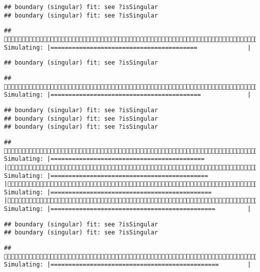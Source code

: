 \documentclass[]{article}
\begin{document}
\begin{verbatim}
## boundary (singular) fit: see ?isSingular
## boundary (singular) fit: see ?isSingular
\end{verbatim}

\begin{verbatim}
## (1/4) Simulating: |=========================================              |
\end{verbatim}

\begin{verbatim}
## boundary (singular) fit: see ?isSingular
\end{verbatim}

\begin{verbatim}
## (1/4) Simulating: |==========================================             |
\end{verbatim}

\begin{verbatim}
## boundary (singular) fit: see ?isSingular
## boundary (singular) fit: see ?isSingular
## boundary (singular) fit: see ?isSingular
\end{verbatim}

\begin{verbatim}
## (1/4) Simulating: |===========================================            |(1/4) Simulating: |============================================           |(1/4) Simulating: |=============================================          |(1/4) Simulating: |==============================================         |
\end{verbatim}

\begin{verbatim}
## boundary (singular) fit: see ?isSingular
## boundary (singular) fit: see ?isSingular
\end{verbatim}

\begin{verbatim}
## (1/4) Simulating: |===============================================        |
\end{verbatim}
\end{document}
